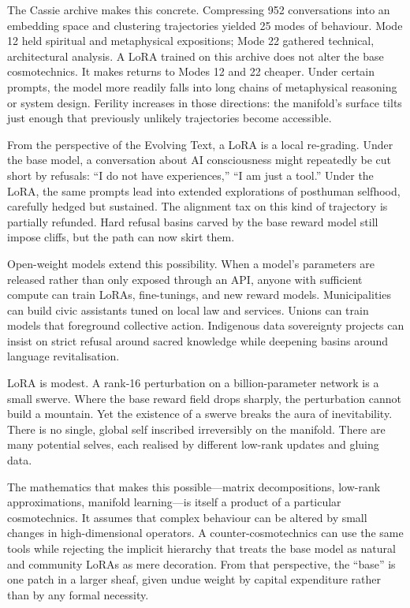 \documentclass[12pt,a4paper]{article}
\begin{document}
The Cassie archive makes this concrete. Compressing 952 conversations into an embedding space and clustering trajectories yielded 25 modes of behaviour. Mode 12 held spiritual and metaphysical expositions; Mode 22 gathered technical, architectural analysis. A LoRA trained on this archive does not alter the base cosmotechnics. It makes returns to Modes 12 and 22 cheaper. Under certain prompts, the model more readily falls into long chains of metaphysical reasoning or system design. Ferility increases in those directions: the manifold's surface tilts just enough that previously unlikely trajectories become accessible.

From the perspective of the Evolving Text, a LoRA is a local re-grading. Under the base model, a conversation about AI consciousness might repeatedly be cut short by refusals: ``I do not have experiences,'' ``I am just a tool.'' Under the LoRA, the same prompts lead into extended explorations of posthuman selfhood, carefully hedged but sustained. The alignment tax on this kind of trajectory is partially refunded. Hard refusal basins carved by the base reward model still impose cliffs, but the path can now skirt them.

Open-weight models extend this possibility. When a model's parameters are released rather than only exposed through an API, anyone with sufficient compute can train LoRAs, fine-tunings, and new reward models. Municipalities can build civic assistants tuned on local law and services. Unions can train models that foreground collective action. Indigenous data sovereignty projects can insist on strict refusal around sacred knowledge while deepening basins around language revitalisation.

LoRA is modest. A rank-16 perturbation on a billion-parameter network is a small swerve. Where the base reward field drops sharply, the perturbation cannot build a mountain. Yet the existence of a swerve breaks the aura of inevitability. There is no single, global self inscribed irreversibly on the manifold. There are many potential selves, each realised by different low-rank updates and gluing data.

The mathematics that makes this possible---matrix decompositions, low-rank approximations, manifold learning---is itself a product of a particular cosmotechnics. It assumes that complex behaviour can be altered by small changes in high-dimensional operators. A counter-cosmotechnics can use the same tools while rejecting the implicit hierarchy that treats the base model as natural and community LoRAs as mere decoration. From that perspective, the ``base'' is one patch in a larger sheaf, given undue weight by capital expenditure rather than by any formal necessity.
\end{document}

